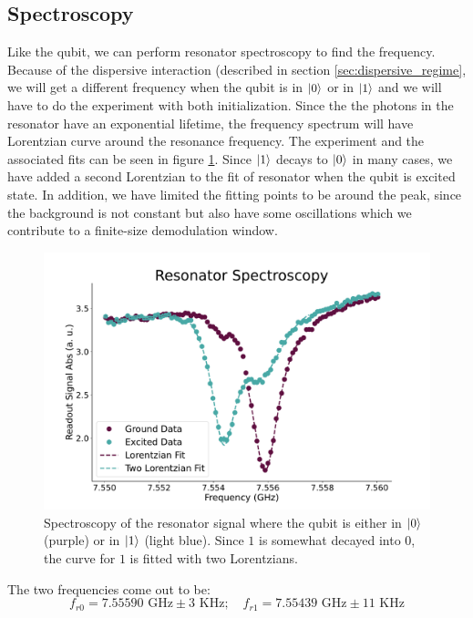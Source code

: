 \subsection{Spectroscopy}
Like the qubit, we can perform resonator spectroscopy to find the frequency. Because of the dispersive interaction (described in section \ref{sec:dispersive_regime}, we will get a different frequency when the qubit is in $\ket{0}$ or in $\ket{1}$ and we will have to do the experiment with both initialization. Since the the photons in the resonator have an exponential lifetime, the frequency spectrum will have Lorentzian curve around the resonance frequency. The experiment and the associated fits can be seen in figure \ref{fig:spectroscopy_resonator}. Since $\ket{1}$ decays to $\ket{0}$ in many cases, we have added a second Lorentzian to the fit of resonator when the qubit is excited state. In addition, we have limited the fitting points to be around the peak, since the background is not constant but also have some oscillations which we contribute to a finite-size demodulation window.
\begin{figure}
    \centering
    \includegraphics{Calibrations/Figures/Resonator Spectroscopy.pdf}
    \caption{Spectroscopy of the resonator signal where the qubit is either in $\ket{0}$ (purple) or in $\ket{1}$ (light blue). Since $1$ is somewhat decayed into $0$, the curve for $1$ is fitted with two Lorentzians.}
    \label{fig:spectroscopy_resonator}
\end{figure}
The two frequencies come out to be:
\begin{equation}
     f_{r0} = 7.55590 \text{ GHz} \pm 3 \text{ KHz} ;\quad f_{r1} =  7.55439 \text{ GHz} \pm 11 \text{ KHz}
\end{equation}

